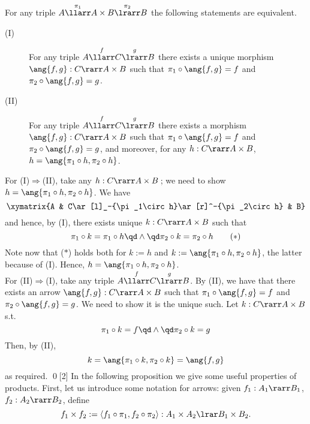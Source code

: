 \documentclass[12pt]{article}
\begin{document}
\begin{myproposition}\label{p:prod}
For any triple $A\overset{\pi_1}{\llarr}A\times B\overset{\pi_2}{\lrarr}B$ the following statements are equivalent.
\begin{description}
\item[(I)] For any triple $A\overset{f}{\llarr}C\overset{g}{\lrarr}B$ there exists a {unique} morphism $\ang{f,g}:C\rarr A\times B$
                        such that $\pi_1\circ\ang{f,g}=f$ and $\pi_2\circ\ang{f,g}=g$.
\item[(II)]For any triple $A\overset{f}{\llarr}C\overset{g}{\lrarr}B$ there exists a morphism $\ang{f,g}:C\rarr A\times B$
                        such that $\pi_1\circ\ang{f,g}=f$ and $\pi_2\circ\ang{f,g}=g$, and
                        moreover, for any $h:C\rarr A\times B$, $h=\ang{\pi_1\circ h,\pi_2\circ h}$.
\end{description}
\end{myproposition}
\proof
%
For (I)$\Rightarrow$(II), take any $h:C\rarr A\times B$\,; we need to show $h=\ang{\pi_1\circ h,\pi_2\circ h}$. We have
\[ \xymatrix{A & C\ar[l]_-{\pi_1\circ h}\ar[r]^-{\pi_2\circ h} & B} \]
and hence, by (I), there exists unique $k:C\rarr A\times B$ such that
\[ \pi_1\circ k= \pi_1\circ h \qd\land\qd \pi_2\circ k= \pi_2\circ h \tag{$*$}\]
Note now that ($*$) holds both for $k:=h$ and $k:=\ang{\pi_1\circ h,\pi_2\circ h}$, the latter because of (I). Hence, $h=\ang{\pi_1\circ h,\pi_2\circ
h}$.
\\
For (II)$\Rightarrow$(I), take any triple $A\overset{f}{\llarr}C\overset{g}{\lrarr}B$. By (II), we have that there exists an arrow $\ang{f,g}:C\rarr
A\times B$ such that $\pi_1\circ\ang{f,g}=f$ and $\pi_2\circ\ang{f,g}=g$. We need to show it is the unique such. Let $k:C\rarr A\times B$ s.t.
\[ \pi_1\circ k= f \qd\land\qd \pi_2\circ k= g \]
Then, by (II),
\[ k=\ang{\pi_1\circ k,\pi_2\circ k}=\ang{f,g} \]
as required. \qed[2]
%
In the following proposition we give some useful properties of products. First, let us introduce some notation for arrows: given $f_{1} : A_{1} \rarr
B_{1}$, $f_{2} : A_{2} \rarr B_{2}$, define
\[ f_{1} \times f_{2}  := \langle f_{1} \circ \pi_{1},  f_{2} \circ \pi_{2} \rangle : A_{1} \times A_{2} \lrar B_{1} \times B_{2}. \]
\end{document}
